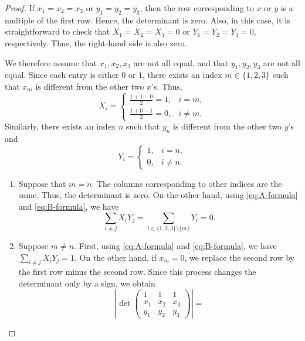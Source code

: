 \documentclass[11pt,a4paper]{amsart}
\theoremstyle{plain}
\theoremstyle{definition}
\begin{document}
\begin{proof}
    If $x_1 = x_2 = x_3$ or $y_1 = y_2 = y_3$, then the row corresponding to $x$ or $y$ is a multiple of the first row. Hence, the determinant is zero. Also, in this case, it is straightforward to check that $X_1 = X_2 = X_3 = 0$ or $Y_1 = Y_2 = Y_3 = 0$, respectively. Thus, the right-hand side is also zero.

    We therefore assume that $x_1,x_2,x_3$ are not all equal, and that $y_1,y_2,y_3$ are not all equal. Since each entry is either $0$ or $1$, there exists an index $m\in \{1,2,3\}$ such that $x_m$ is different from the other two $x$'s. Thus,
    \begin{equation} \label{eq:A-formula}
        X_i =
        \begin{cases}
            \frac{1+1-0}{2} = 1, & i=m,
            \\
            \frac{1+0-1}{2} =0, &i \neq m.
        \end{cases} 
    \end{equation}
    Similarly, there exists an index $n$ such that $y_n$ is different from the other two $y$'s and 
    \begin{equation} \label{eq:B-formula}
        Y_i =
        \begin{cases}
            1, & i=n,
            \\
            0, &i \neq n.
        \end{cases} 
    \end{equation}
    \begin{enumerate}[wide =0pt, labelwidth= 1.1cm]
        \item[\bf Case 1:] Suppose that $m=n$. The columns corresponding to other indices are the same. Thus, the determinant is zero. On the other hand, using \eqref{eq:A-formula} and \eqref{eq:B-formula}, we have 
        \[
            \sum_{i \neq j} X_i Y_j = \sum_{i \in \{1,2,3\} \setminus \{m\}} Y_i =0. 
        \]
        \item[\bf Case 2:] Suppose $ m \neq n$. First, using \eqref{eq:A-formula} and \eqref{eq:B-formula}, we have 
        $\sum_{i \neq j} X_i Y_j =1$.
        On the other hand, if $x_m =0$, we replace the second row by the first row minus the second row. Since this process changes the determinant only by a sign, we obtain
        \[
            \left|\operatorname{det}\left(\begin{array}{ccc}1 & 1 & 1 \\ x_1 & x_2 & x_3 \\ y_1 & y_2 & y_3\end{array}\right)\right|  = 
\]
\end{enumerate}
\end{proof}
\end{document}

